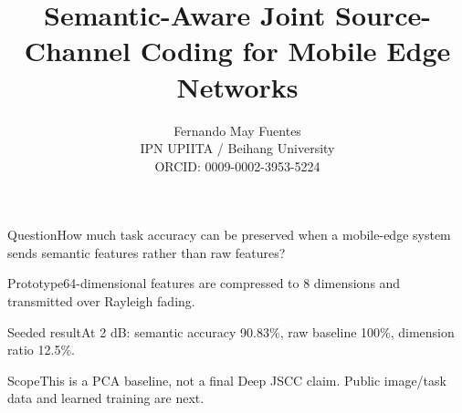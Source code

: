 \documentclass{beamer}
\title{Semantic-Aware Joint Source-Channel Coding for Mobile Edge Networks}
\author{Fernando May Fuentes\\IPN UPIITA / Beihang University\\ORCID: 0009-0002-3953-5224}
\institute{INCC 2026}
\begin{document}
\frame{\titlepage}
\begin{frame}{Question}How much task accuracy can be preserved when a mobile-edge system sends semantic features rather than raw features?\end{frame}
\begin{frame}{Prototype}64-dimensional features are compressed to 8 dimensions and transmitted over Rayleigh fading.\end{frame}
\begin{frame}{Seeded result}At 2 dB: semantic accuracy 90.83\%, raw baseline 100\%, dimension ratio 12.5\%.\end{frame}
\begin{frame}{Scope}This is a PCA baseline, not a final Deep JSCC claim. Public image/task data and learned training are next.\end{frame}
\end{document}
